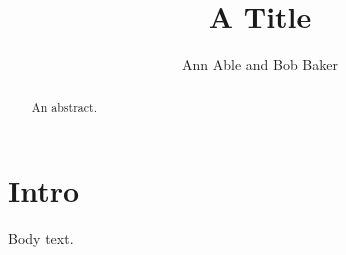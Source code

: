 \documentclass{emulateapj}
\begin{document}
\title{A Title}
\author{Ann Able and Bob Baker}
\begin{abstract}
An abstract.
\end{abstract}
\section{Intro}
Body text.
\end{document}
